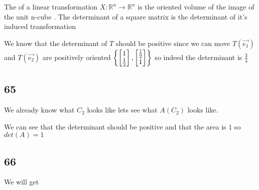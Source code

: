 \documentclass[11pt]{book}
\begin{document}

\begin{defn}[Determinant]\label{defn:determinant}
    The  of a linear transformation $X : \mathbb{R} ^{n}  \to \mathbb{R} ^{n}  $ is the oriented volume of the image of the unit n-cube . The determinant of a square matrix is the determinant of it's induced transformation 
\end{defn}

\begin{eg}
    We know that the determinant of $T$  should be positive since we can move $T\left(\vec{e_1} \right) $ and $T\left(\vec{e_2} \right) $ are positively oriented $\left\{ \begin{bmatrix} 1 \\ \frac{1}{2} \end{bmatrix} , \begin{bmatrix} \frac{1}{2} \\ 1 \end{bmatrix}  \right\} $ so indeed the determinant is $\frac{3}{4}$ 
\end{eg}

\subsection{65}%
\label{sub:65}

We already know what $C_{2} $ looks like lets see what $A\left(C_{2} \right) $ looks like.

\begin{center}
\end{center}

We can see that the determinant should be positive and that the area is $1$ so $\mathit{det} \left(A\right) = 1$ 


\subsection{66}%
\label{sub:66}

We will get

\begin{center}
\end{center}
\end{document}
